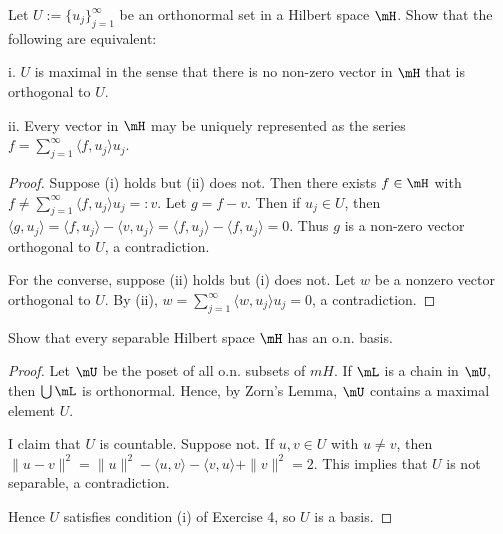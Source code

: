 \documentclass{article}
\begin{document}
 Let $U := \{u_j\}_{j=1}^\infty$ be an orthonormal set in a Hilbert space $\mH$. Show that the following are equivalent:

i. $U$ is maximal in the sense that there is no non-zero vector in $\mH$ that is orthogonal to $U$.

ii. Every vector in $\mH$ may be uniquely represented as the series $f = \sum_{j=1}^\infty \langle f , u_j \rangle u_j$.

\begin{proof}
Suppose (i) holds but (ii) does not.  Then there exists $f \in \mH$ with $f \neq \sum_{j=1}^\infty \langle f , u_j \rangle u_j =: v$.  Let $g = f - v$.  Then if $u_j \in U$, then $\langle g, u_j \rangle = \langle f, u_j \rangle - \langle v, u_j \rangle = \langle f, u_j \rangle - \langle f, u_j \rangle = 0$. Thus $g$ is a non-zero vector orthogonal to $U$, a contradiction.

For the converse, suppose (ii) holds but (i) does not. Let $w$ be a nonzero vector orthogonal to $U$.  By (ii), $w = \sum_{j=1}^\infty \langle w, u_j \rangle u_j = 0$, a contradiction.
\end{proof}

 Show that every separable Hilbert space $\mH$ has an o.n. basis.
\begin{proof}
Let $\mU$ be the poset of all o.n. subsets of $mH$.  If $\mL$ is a chain in $\mU$, then $\bigcup \mL$ is orthonormal.  Hence, by Zorn's Lemma, $\mU$ contains a maximal element $U$. 

I claim that $U$ is countable.  Suppose not. If $u,v \in U$ with $u \neq v$, then $\|u - v\|^2 = \|u\|^2 - \langle u, v \rangle - \langle v, u \rangle + \|v\|^2 = 2$.  This implies that $U$ is not separable, a contradiction.

Hence $U$ satisfies condition (i) of Exercise 4, so $U$ is a basis.
\end{proof}
\end{document}
